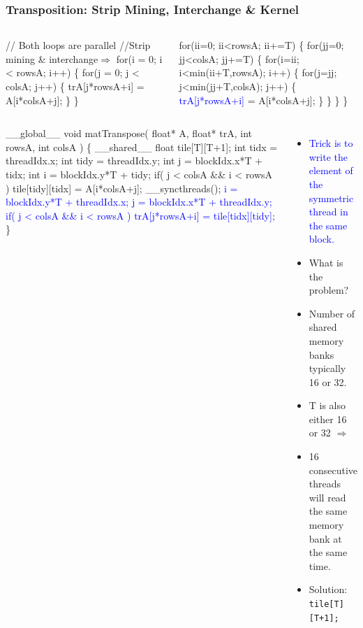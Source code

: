 \documentclass{beamer}
\newcommand{\blue}[1]{\textcolor{Blue}{{#1}}}
\renewcommand{\emph}[1]{\textcolor{structure}{#1}}
\newcommand{\emp}[1]{\textcolor{DikuRed}{ #1}}
\newcommand{\emphh}[1]{\textcolor{CosGreen}{ #1}}
\newcommand{\mymath}[1]{$ #1 $}
\begin{document}
\begin{frame}[fragile,t]
  \frametitle{Transposition: Strip Mining, Interchange \& Kernel} 
\vspace{-1ex}
\begin{columns}
\begin{colorcode}[fontsize=\scriptsize]
//\emphh{Both loops are parallel}
//Strip mining \& interchange\mymath{\Rightarrow}
for(i = 0; i < rowsA; i++) \{    
  for(j = 0; j < colsA; j++) \{ 
    trA[j*rowsA+i] = A[i*colsA+j];
\} \}
\end{colorcode}
\begin{colorcode}[fontsize=\scriptsize]
\emp{for(ii=0; ii<rowsA; ii+=T) \{}
  \emp{for(jj=0; jj<colsA; jj+=T) \{}
    \emphh{for(i=ii; i<min(ii+T,rowsA); i++) \{}
      \emphh{for(j=jj; j<min(jj+T,colsA); j++) \{}
        \blue{trA[j*rowsA+i]} = A[i*colsA+j];
\} \} \} \}
\end{colorcode}
\end{columns}

\pause

\begin{columns}
\begin{colorcode}[fontsize=\scriptsize]
__global__ void matTranspose(
        float* A,  float* trA, 
        int rowsA, int colsA  ) \{
  __shared__ float tile[T][\alert{T}+1];
  int tidx = threadIdx.x;
  int tidy = threadIdx.y;
  int j    = blockIdx.x*T + tidx;
  int i    = blockIdx.y*T + tidy;
  if( j < colsA && i < rowsA )
    tile[tidy][tidx] = A[i*colsA+j];
  __syncthreads();
  \blue{i = blockIdx.y*T + threadIdx.x;} 
  \blue{j = blockIdx.x*T + threadIdx.y;}
  \blue{if( j < colsA && i < rowsA )}
    \blue{trA[j*rowsA+i] = tile[tidx]\alert{[tidy]};}
\}
\end{colorcode}
\begin{itemize}
    \item \blue{Trick is to write the element of the symmetric thread in the same block.}
    \item \alert{What is the problem?}\pause
    \item Number of shared memory banks typically 16 or 32.
    \item T is also either 16 or 32 $\Rightarrow$
    \item 16 consecutive threads will read the same 
            memory bank at the same time.
    \item \emph{Solution: {\tt tile[T][\alert{T+1}];} }
\end  {itemize}
\end{columns}

\end{frame}
\end{document}
